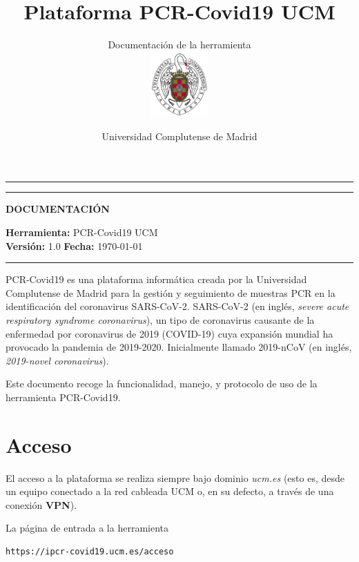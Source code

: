 \documentclass[a4paper,spanish]{paper}
\title{Plataforma PCR-Covid19 UCM}
\subtitle{Documentación de la herramienta\\
\hfill\includegraphics[height=2.5cm]{UCMlogo.png}
\vspace{-3cm}}
\author{Universidad Complutense de Madrid}
\begin{document}
 
\vspace{-3.5cm}
\maketitle
\hrule \hrule
\medskip
\vspace{-0.2cm}

\begin{center}
\textbf{DOCUMENTACIÓN}
\end{center}
\vspace{-0.3cm}
\textbf{Herramienta:} PCR-Covid19 UCM\\
\textbf{Versión:} 1.0
\textbf{Fecha:} \today\\



\medskip
\hrule
\hspace{1cm}

PCR-Covid19 es una plataforma informática creada por la Universidad Complutense de Madrid para la gestión y seguimiento de muestras PCR en la identificación del coronavirus SARS-CoV-2. SARS-CoV-2 (en inglés, \textit{severe acute respiratory syndrome coronavirus}), un tipo de coronavirus causante de la enfermedad por coronavirus de 2019 (COVID-19) cuya expansión mundial ha provocado la pandemia de 2019-2020. Inicialmente llamado 2019-nCoV (en inglés, \textit{2019-novel coronavirus}).



\medskip
\begin{tcolorbox}[colback=blue!3!white,colframe=blue(ryb)!50!black,title=\textbf{Contenido}]

Este documento recoge la funcionalidad, manejo, y protocolo de uso de la herramienta PCR-Covid19.

\end{tcolorbox}

\section{Acceso}

El acceso a la plataforma se realiza siempre bajo dominio \textit{ucm.es} (esto es, desde un equipo conectado a la red cableada UCM o, en su defecto, a través de una conexión \textbf{VPN}).

La página de entrada a la herramienta

\begin{center}
\begin{minipage}{8cm}
\begin{verbatim}
https://ipcr-covid19.ucm.es/acceso
\end{verbatim}
\end{minipage}
\end{center}
\end{document}
